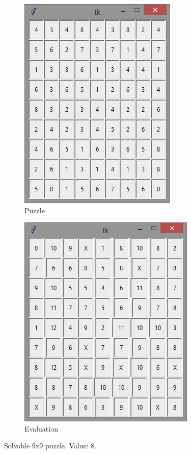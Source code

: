 \documentclass[12pt]{article}
\begin{document}
\begin{figure}[H]
	\begin{subfigure}{.5\textwidth}
		\centering
     		\includegraphics[width = .6\linewidth]{9x9_puzzle_8}
     		\caption{Puzzle}
     		\label{fig6:sfig1}
	\end{subfigure}
	\begin{subfigure}{.5\textwidth}
		\centering
		\includegraphics[width = .6\linewidth]{9x9_eval_8}
		\caption{Evaluation}
		\label{fig6:sfig2}
	\end{subfigure}
\caption{Solvable 9x9 puzzle. Value: 8.}
\label{fig:9x9good}
\end{figure}
\end{document}
